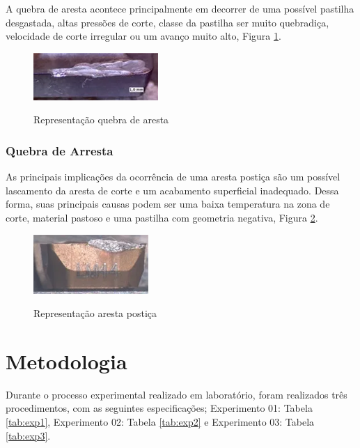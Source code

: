 \documentclass[deposito, acronym, symbols]{fei}
\begin{document}
A quebra de aresta acontece principalmente em decorrer de uma possível pastilha desgastada, altas pressões de corte, classe da pastilha ser muito quebradiça, velocidade de corte irregular ou um avanço muito alto, Figura \ref{fig:quebra}.

\begin{figure}[!htb]
 \centering
    \caption{Representação quebra de aresta}
    \includegraphics[width=0.4\linewidth]{Imagens/Exp03_quebra.png}
    \label{fig:quebra}
 \end{figure}

\subsection{Quebra de Arresta}

As principais implicações da ocorrência de uma aresta postiça são um possível lascamento da aresta de corte e um acabamento superficial inadequado. Dessa forma, suas principais causas podem ser uma baixa temperatura na zona de corte, material pastoso e uma pastilha com geometria negativa, Figura \ref{fig:postiça}.

\begin{figure}[!htb]
 \centering
    \caption{Representação aresta postiça}
    \includegraphics[width=0.4\linewidth]{Imagens/Exp03_postiça.png}
    \label{fig:postiça}
 \end{figure}


\chapter{Metodologia}

Durante o processo experimental realizado em laboratório, foram realizados três procedimentos, com as seguintes especificações; Experimento 01: Tabela \ref{tab:exp1}, Experimento 02: Tabela \ref{tab:exp2} e Experimento 03: Tabela \ref{tab:exp3}.
\end{document}
